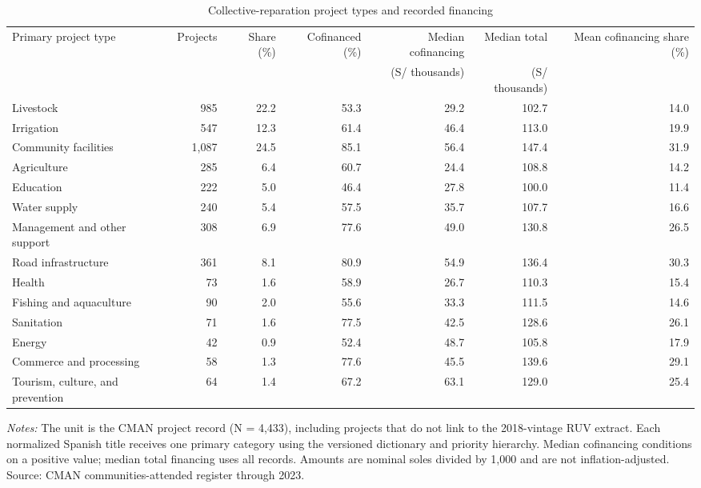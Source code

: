 \begin{table}[!htbp]
\centering
\caption{Collective-reparation project types and recorded financing}
\label{tab:desc_project_types_financing}
\begin{tabular}{lrrrrrr}
\toprule
Primary project type & Projects & Share (\%) & Cofinanced (\%) & Median cofinancing & Median total & Mean cofinancing share (\%) \\
 &  &  &  & (S/ thousands) & (S/ thousands) &  \\
\midrule
Livestock & 985 & 22.2 & 53.3 & 29.2 & 102.7 & 14.0 \\
Irrigation & 547 & 12.3 & 61.4 & 46.4 & 113.0 & 19.9 \\
Community facilities & 1,087 & 24.5 & 85.1 & 56.4 & 147.4 & 31.9 \\
Agriculture & 285 & 6.4 & 60.7 & 24.4 & 108.8 & 14.2 \\
Education & 222 & 5.0 & 46.4 & 27.8 & 100.0 & 11.4 \\
Water supply & 240 & 5.4 & 57.5 & 35.7 & 107.7 & 16.6 \\
Management and other support & 308 & 6.9 & 77.6 & 49.0 & 130.8 & 26.5 \\
Road infrastructure & 361 & 8.1 & 80.9 & 54.9 & 136.4 & 30.3 \\
Health & 73 & 1.6 & 58.9 & 26.7 & 110.3 & 15.4 \\
Fishing and aquaculture & 90 & 2.0 & 55.6 & 33.3 & 111.5 & 14.6 \\
Sanitation & 71 & 1.6 & 77.5 & 42.5 & 128.6 & 26.1 \\
Energy & 42 & 0.9 & 52.4 & 48.7 & 105.8 & 17.9 \\
Commerce and processing & 58 & 1.3 & 77.6 & 45.5 & 139.6 & 29.1 \\
Tourism, culture, and prevention & 64 & 1.4 & 67.2 & 63.1 & 129.0 & 25.4 \\
\bottomrule
\end{tabular}
\parbox{0.98\linewidth}{\footnotesize \textit{Notes:} The unit is the CMAN project record (N = 4,433), including projects that do not link to the 2018-vintage RUV extract. Each normalized Spanish title receives one primary category using the versioned dictionary and priority hierarchy. Median cofinancing conditions on a positive value; median total financing uses all records. Amounts are nominal soles divided by 1,000 and are not inflation-adjusted. Source: CMAN communities-attended register through 2023.}
\end{table}
